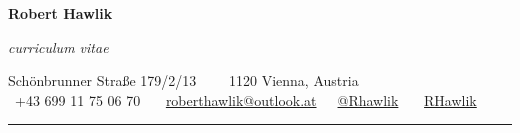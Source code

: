\documentclass[11pt, a4paper]{article}
\begin{document}
\begin{center}
{\LARGE \textbf{Robert Hawlik}}

\emph{curriculum vitae}
\vspace{6pt}

Schönbrunner Straße 179/2/13\ \ \textbullet
\ \ 1120 Vienna, Austria
\\
\faMobile \ +43 699 11 75 06 70 \ \ \faPaperPlane \ \href{mailto:roberthawlik@outlook.at}{roberthawlik@outlook.at}\ \ \faTwitter \ \href{https://twitter.com/RHawlik}{@Rhawlik} \ \ \faLinkedin \ \href{https://www.linkedin.com/in/rhawlik}{RHawlik}
\vspace{-5pt}
\end{center}

\hrule
\vspace{0em}

%
\end{document}
